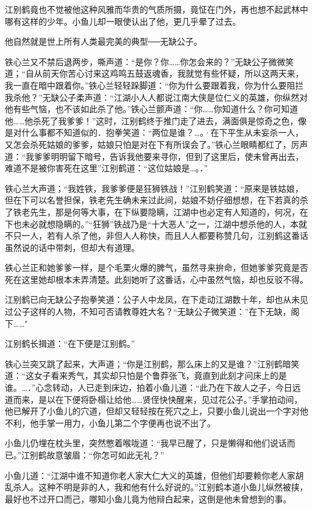 \documentclass[12pt,oneside]{book}
\begin{document}
江别鹤竟也不觉被他这种风雅而华贵的气质所摄，竟怔在门外，再也想不起武林中哪有这样的少年。小鱼儿却一眼使认出了他，更几乎晕了过去。

他自然就是世上所有人类最完美的典型──无缺公子。

铁心兰又不禁后退两步，嘶声道：``是你？你\ldots\ldots 你怎会来的？''无缺公子微微笑道；``自从前天你苦心讨来这鸡鸣五鼓返魂香，我就觉有些怀疑，所以这两天来，我一直在暗中跟着你。''铁心兰轻轻跺脚道：``你为什么要跟着我，你为什么要阻拦我杀他？''无缺公子柔声道：``江湖小人人都说江南大侠是位仁义的英雄，你纵然对他有些气恼，也不该如此杀了他。''铁心兰颤声道：``你\ldots\ldots 你知道什么？你可知道他\ldots\ldots 他杀死了我爹爹！''这时，江别鹤终于推门走了进去，满面俱是惊奇之色，像是对什么事都不知道似的．抱拳笑道：``两位是谁？\ldots。·在下平生从未妄杀一人，又怎会杀死姑娘的爹爹，姑娘只怕是对在下有所误会了。''铁心兰眼睛都红了，厉声道：``我爹爹明明留下暗号，告诉我他要来寻你，但到了这里后，使未曾再出去，难道不是被你害死在这里''江别鹤道：``这位姑娘是\ldots。．''

铁心兰大声道；``我姓铁，我爹爹便是狂狮铁战！''江别鹤笑道：``原来是铁姑娘，但在下可以名誉担保，铁老先生确未来过此间，姑娘不妨仔细想想，在下若真的杀了铁老先生，那是何等大事，在下纵要隐瞒，江湖中也必定有人知道的，何况，在下也未必就想隐瞒的。''``狂狮''铁战乃是``十大恶人''之一，江湖中想杀他的人，本就不只一人，若有人杀了他，非但人人称快，而且人人都要称赞几句，江别鹤这番话虽然说的话中带刺，但却大有道理。

铁心兰正和她爹爹一样，是个毛栗火爆的脾气，虽然寻来拚命，但她爹爹究竟是否死在这里她却根本未弄清楚。此刻她听了这番话，心中虽然气恼，却也反驳不得。

江别鹤已向无缺公子抱拳笑道：公子人中龙凤，在下走动江湖数十年，却也从未见过公子这样的人物，不知可否请教尊姓大名？``无缺公子微笑道：''在下无缺，阁下\ldots\ldots"

江别鹤长揖道：``在下便是江别鹤。''

铁心兰突又跳了起来，大声道；``你是江别鹤，那么床上的又是谁？''江别鹤暗笑道：``这女子看来秀气，其实却只怕是个鲁莽张飞，竟直到此刻才问床上的是谁。\ldots．''心念转动，人已走到床边，拍着小鱼儿道：``此乃在下故人之子，今日远道而来，是以在下便将卧榻让给他\ldots\ldots 贤侄快快醒来，见过花公子。''手掌拍动间，他已解开了小鱼儿的穴道，但却又轻轻按在死穴之上，只要小鱼儿说出一个字对他不利，他手掌一用力，小鱼儿第二个字便再也说不出了。

小鱼儿仍埋在枕头里，突然憋着喉咙道：``我早已醒了，只是懒得和他们说话而已。''江别鹤故意皱眉：``你怎可如此无礼？''

小鱼儿道：``江湖中谁不知道你老人家大仁大义的英雄，但他们却要赖你老人家胡乱杀人。这种不明是非的人，我和他有什么好说的。''江别鹤本道小鱼儿纵然被挟，最好也不过开口而己，哪知小鱼儿竟为他辩白起来，这倒是他未曾想到的事。
\end{document}
